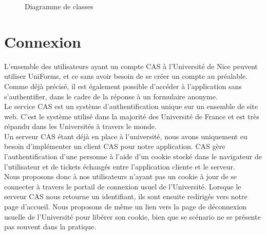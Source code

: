 \documentclass{sigplanconf}
\begin{document}
\begin{figure}
\begin{center}
\end{center}
\caption{Diagramme de classes}\label{diagrammeClasses}
\end{figure}

\section{Connexion}
L’ensemble des utilisateurs ayant un compte CAS à l’Université de Nice peuvent utiliser UniForms, et ce sans avoir besoin de se créer un compte au préalable. Comme déjà précisé, il est également possible d’accéder à l’application sans s’authentifier, dans le cadre de la réponse à un formulaire anonyme.\\

Le service CAS est un système d’authentification unique sur un ensemble de site web. C’est le système utilisé dans la majorité des Université de France et est très répandu dans les Universités à travers le monde.\\
Un serveur CAS étant déjà en place à l’université, nous avons uniquement eu besoin d’implémenter un client CAS pour notre application. CAS gère l’authentification d’une personne à l’aide d’un cookie stocké dans le navigateur de l’utilisateur et de tickets échangés entre l’application cliente et le serveur.\\
Nous proposons donc à nos utilisateurs n’ayant pas un cookie à jour de se connecter à travers le portail de connexion usuel de l’Université. Lorsque le serveur CAS nous retourne un identifiant, ils sont ensuite redirigés vers notre page d’accueil. Nous proposons de même un lien vers la page de déconnexion usuelle de l’Université pour libérer son cookie, bien que se scénario ne se présente pas souvent dans la pratique.
\end{document}
